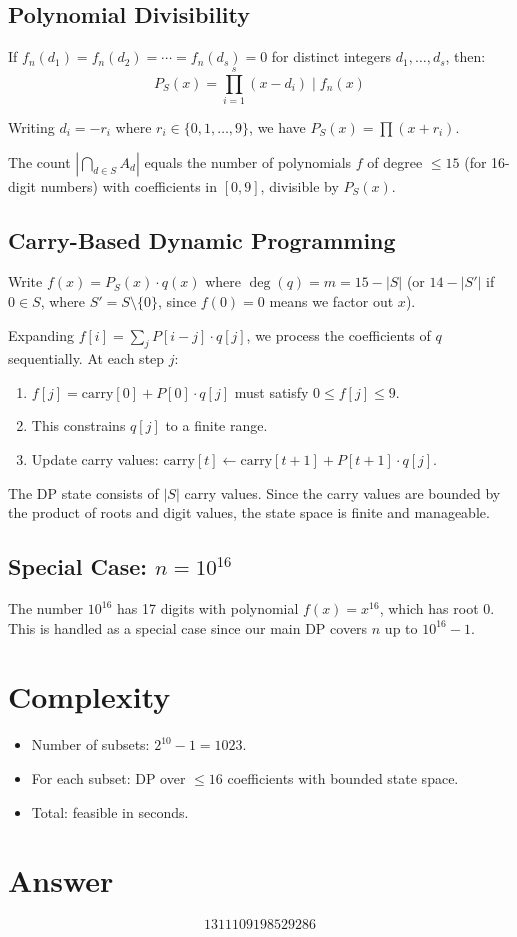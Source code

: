 \documentclass[12pt]{article}
\theoremstyle{definition}
\begin{document}
\subsection{Polynomial Divisibility}
If $f_n(d_1) = f_n(d_2) = \cdots = f_n(d_s) = 0$ for distinct integers $d_1, \ldots, d_s$, then:
\[ P_S(x) = \prod_{i=1}^{s} (x - d_i) \mid f_n(x) \]

Writing $d_i = -r_i$ where $r_i \in \{0,1,\ldots,9\}$, we have $P_S(x) = \prod (x + r_i)$.

The count $|\bigcap_{d \in S} A_d|$ equals the number of polynomials $f$ of degree $\leq 15$ (for 16-digit numbers) with coefficients in $[0,9]$, divisible by $P_S(x)$.

\subsection{Carry-Based Dynamic Programming}
Write $f(x) = P_S(x) \cdot q(x)$ where $\deg(q) = m = 15 - |S|$ (or $14 - |S'|$ if $0 \in S$, where $S' = S \setminus \{0\}$, since $f(0) = 0$ means we factor out $x$).

Expanding $f[i] = \sum_{j} P[i-j] \cdot q[j]$, we process the coefficients of $q$ sequentially. At each step $j$:
\begin{enumerate}
    \item $f[j] = \text{carry}[0] + P[0] \cdot q[j]$ must satisfy $0 \leq f[j] \leq 9$.
    \item This constrains $q[j]$ to a finite range.
    \item Update carry values: $\text{carry}[t] \leftarrow \text{carry}[t+1] + P[t+1] \cdot q[j]$.
\end{enumerate}

The DP state consists of $|S|$ carry values. Since the carry values are bounded by the product of roots and digit values, the state space is finite and manageable.

\subsection{Special Case: $n = 10^{16}$}
The number $10^{16}$ has 17 digits with polynomial $f(x) = x^{16}$, which has root $0$. This is handled as a special case since our main DP covers $n$ up to $10^{16} - 1$.

\section{Complexity}
\begin{itemize}
    \item Number of subsets: $2^{10} - 1 = 1023$.
    \item For each subset: DP over $\leq 16$ coefficients with bounded state space.
    \item Total: feasible in seconds.
\end{itemize}

\section{Answer}

\[
\boxed{1311109198529286}
\]
\end{document}
